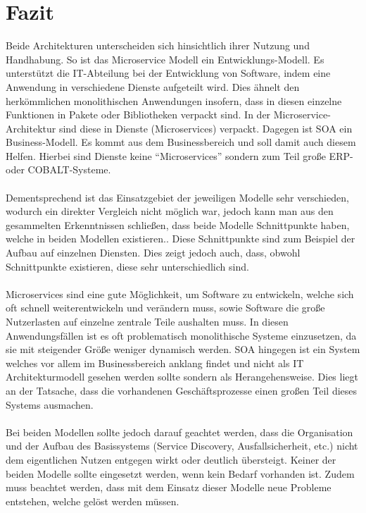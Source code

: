\section{Fazit}
\label{sec:Fazit}
Beide Architekturen unterscheiden sich hinsichtlich ihrer Nutzung und Handhabung. So ist das Microservice Modell ein Entwicklungs-Modell. Es unterstützt die IT-Abteilung bei der Entwicklung von Software, indem eine Anwendung in verschiedene Dienste aufgeteilt wird. Dies ähnelt den herkömmlichen monolithischen Anwendungen insofern, dass in diesen einzelne Funktionen in Pakete oder Bibliotheken verpackt sind. In der Microservice-Architektur sind diese in Dienste (Microservices) verpackt. Dagegen ist SOA ein Business-Modell. Es kommt aus dem Businessbereich und soll damit auch diesem Helfen. Hierbei sind Dienste keine "`Microservices"' sondern zum Teil große ERP- oder COBALT-Systeme.
\\\\
Dementsprechend ist das Einsatzgebiet der jeweiligen Modelle sehr verschieden, wodurch ein direkter Vergleich nicht möglich war, jedoch kann man aus den gesammelten Erkenntnissen schließen, dass beide Modelle  Schnittpunkte haben, welche in beiden Modellen existieren.. Diese Schnittpunkte sind zum Beispiel der Aufbau auf einzelnen Diensten. Dies zeigt jedoch auch, dass, obwohl Schnittpunkte existieren, diese sehr unterschiedlich sind.
\\\\
Microservices sind eine gute Möglichkeit, um Software zu entwickeln, welche sich oft schnell weiterentwickeln und verändern muss, sowie Software die große Nutzerlasten auf einzelne zentrale Teile aushalten muss. In diesen Anwendungsfällen ist es oft problematisch monolithische Systeme einzusetzen, da sie mit steigender Größe weniger dynamisch werden.
SOA hingegen ist ein System welches vor allem im Businessbereich anklang findet und nicht als IT Architekturmodell gesehen werden sollte sondern als Herangehensweise. Dies liegt an der Tatsache, dass die vorhandenen Geschäftsprozesse einen großen Teil dieses Systems ausmachen.
\\\\
Bei beiden Modellen sollte jedoch darauf geachtet werden, dass die Organisation und der Aufbau des Basissystems (Service Discovery, Ausfallsicherheit, etc.) nicht dem eigentlichen Nutzen entgegen wirkt oder deutlich übersteigt. Keiner der beiden Modelle sollte eingesetzt werden, wenn kein Bedarf vorhanden ist. Zudem muss beachtet werden, dass mit dem Einsatz dieser Modelle neue Probleme entstehen, welche gelöst werden müssen.
